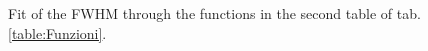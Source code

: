\begin{figure}[H]
	\begin{minipage}[c]{0.5\linewidth}
	\end{minipage}
	\begin{minipage}[]{0.5\linewidth}
	\centering
	\end{minipage}
	\caption{Fit of the FWHM through the functions in the second table of tab.\ref{table:Funzioni}.}
    \label{fig:FWHM}
	\end{figure}

